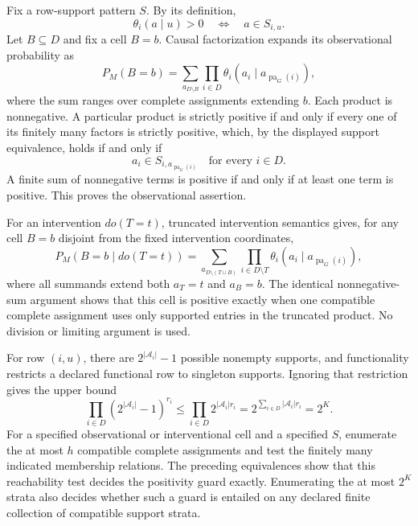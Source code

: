 Fix a row-support pattern \(S\).  By its definition,
\[
 \theta_i(a\mid u)>0
 \quad\Longleftrightarrow\quad
 a\in S_{i,u}.
\]
Let \(B\subseteq D\) and fix a cell \(B=b\).  Causal factorization expands its observational probability as
\[
 P_M(B=b)
 =\sum_{a_{D\setminus B}}
   \prod_{i\in D}
   \theta_i(a_i\mid a_{\operatorname{pa}_G(i)}),
\]
where the sum ranges over complete assignments extending \(b\).  Each product is nonnegative.  A particular product is strictly positive if and only if every one of its finitely many factors is strictly positive, which, by the displayed support equivalence, holds if and only if
\[
 a_i\in S_{i,a_{\operatorname{pa}_G(i)}}
 \quad\text{for every }i\in D.
\]
A finite sum of nonnegative terms is positive if and only if at least one term is positive.  This proves the observational assertion.

For an intervention \(do(T=t)\), truncated intervention semantics gives, for any cell \(B=b\) disjoint from the fixed intervention coordinates,
\[
 P_M(B=b\mid do(T=t))
 =\sum_{a_{D\setminus(T\cup B)}}
   \prod_{i\in D\setminus T}
   \theta_i(a_i\mid a_{\operatorname{pa}_G(i)}),
\]
where all summands extend both \(a_T=t\) and \(a_B=b\).  The identical nonnegative-sum argument shows that this cell is positive exactly when one compatible complete assignment uses only supported entries in the truncated product.  No division or limiting argument is used.

For row \((i,u)\), there are \(2^{|\mathcal A_i|}-1\) possible nonempty supports, and functionality restricts a declared functional row to singleton supports.  Ignoring that restriction gives the upper bound
\[
 \prod_{i\in D}
 \left(2^{|\mathcal A_i|}-1\right)^{r_i}
 \le
 \prod_{i\in D}2^{|\mathcal A_i|r_i}
 =2^{\sum_{i\in D}|\mathcal A_i|r_i}
 =2^K.
\]
For a specified observational or interventional cell and a specified \(S\), enumerate the at most \(h\) compatible complete assignments and test the finitely many indicated membership relations.  The preceding equivalences show that this reachability test decides the positivity guard exactly.  Enumerating the at most \(2^K\) strata also decides whether such a guard is entailed on any declared finite collection of compatible support strata.